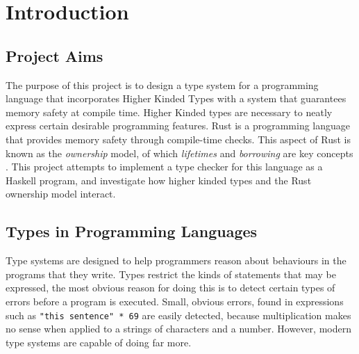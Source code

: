 \chapter{Introduction}\label{sec:intro}

\section{Project Aims}

The purpose of this project is to design a type system for a programming
language that incorporates Higher Kinded Types with a system that guarantees
memory safety at compile time. Higher Kinded types are necessary to neatly
express certain desirable programming features. Rust is a programming language
that provides memory safety through compile-time checks. This aspect of Rust is
known as the \textit{ownership} model, of which \textit{lifetimes} and
\textit{borrowing} are key concepts \cite{rust}. This project attempts to
implement a type checker for this language as a Haskell program, and
investigate how higher kinded types and the Rust ownership model interact.

\section{Types in Programming Languages}
Type systems are designed to help programmers reason about behaviours in the
programs that they write. Types restrict the kinds of statements that may be
expressed, the most obvious reason for doing this is to detect certain types of
errors before a program is executed. Small, obvious errors, found in
expressions such as \lstinline{"this sentence" * 69} are easily detected,
because multiplication makes no sense when applied to a strings of characters
and a number.  However, modern type systems are capable of doing far more. 


